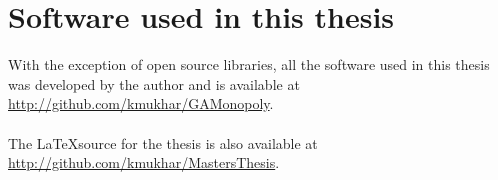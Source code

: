 \clearpage
\newpage
\chapter{Software used in this thesis}
\label{appendix:software}


With the exception of open source libraries, all the software used in this
thesis was developed by the author and is available at
\url{http://github.com/kmukhar/GAMonopoly}. \\ \\

The \LaTeX source for the thesis is also available at
\url{http://github.com/kmukhar/MastersThesis}.
